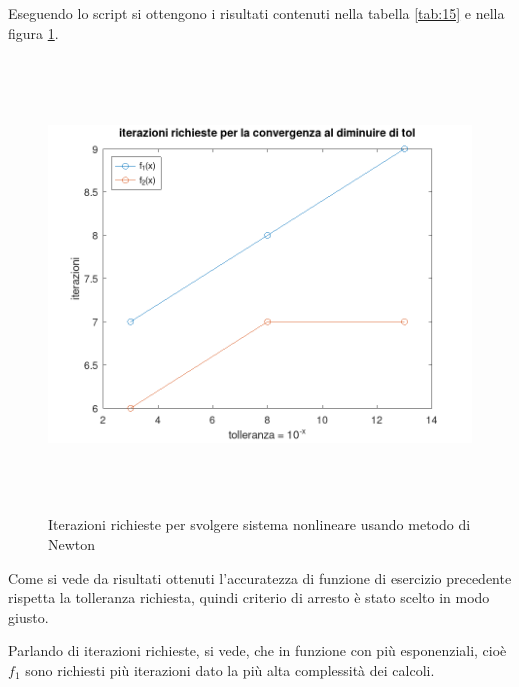 Eseguendo lo script  si ottengono i risultati contenuti nella tabella \ref{tab:15}
e nella figura \ref{fig:es15}.
\begin{table}[ht]
    \centering
    \renewcommand\arraystretch{2}
    \caption{Soluzioni di sistemi nonlineari usando metodo di Newton}
    \label{tab:15}
\end{table}
\FloatBarrier
\begin{figure}[!ht]
    \centering
    \includegraphics[width=16cm,height=12cm,keepaspectratio]{capitolo3/es15_figure.png}
    \caption{Iterazioni richieste per svolgere sistema nonlineare usando metodo di Newton}
    \label{fig:es15}
\end{figure}
\FloatBarrier
Come si vede da risultati ottenuti l'accuratezza di funzione di esercizio precedente
rispetta la tolleranza richiesta, quindi criterio di arresto è stato scelto in modo giusto.

Parlando di iterazioni richieste, si vede, che in funzione con più esponenziali, cioè $f_{1}$
sono richiesti più iterazioni dato la più alta complessità dei calcoli.
